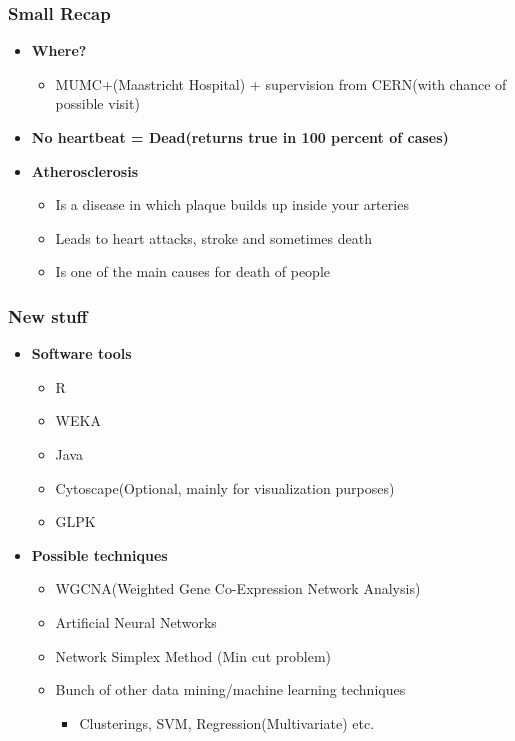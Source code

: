 \documentclass{beamer}
\begin{document}
\begin{frame}
\frametitle{Small Recap}
\begin{itemize}
	\item \textbf{Where?}
	\begin{itemize}
		\item MUMC+(Maastricht Hospital) + supervision from CERN(with chance of possible visit)
	\end{itemize}
	\item \textbf{No heartbeat = Dead(returns true in 100 percent of cases)}
	\item \textbf{Atherosclerosis}
	\begin{itemize}
		\item Is a disease in which plaque builds up inside your arteries
		\item Leads to heart attacks, stroke and sometimes death
		\item Is one of the main causes for death of people
	\end{itemize}
\end{itemize}
\end{frame}

\begin{frame}
\frametitle{New stuff}
\begin{itemize}
\item \textbf{Software tools}
	\begin{itemize}
		\item R
		\item WEKA
		\item Java
		\item Cytoscape(Optional, mainly for visualization purposes)
		\item GLPK
	\end{itemize}
\item \textbf{Possible techniques}
	\begin{itemize}
		\item WGCNA(Weighted Gene Co-Expression Network Analysis)
		\item Artificial Neural Networks
		\item Network Simplex Method (Min cut problem)
		\item Bunch of other data mining/machine learning techniques
		\begin{itemize}
			\item Clusterings, SVM, Regression(Multivariate) etc.
		\end{itemize}
	\end{itemize}
\end{itemize}
\end{frame}
\end{document}
